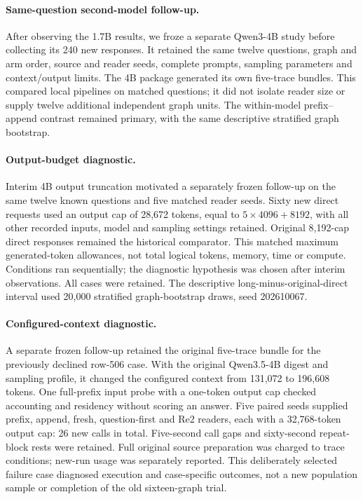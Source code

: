 \paragraph{Same-question second-model follow-up.} After observing the 1.7B results, we froze a separate Qwen3-4B study before collecting its 240 new responses. It retained the same twelve questions, graph and arm order, source and reader seeds, complete prompts, sampling parameters and context/output limits. The 4B package generated its own five-trace bundles. This compared local pipelines on matched questions; it did not isolate reader size or supply twelve additional independent graph units. The within-model prefix--append contrast remained primary, with the same descriptive stratified graph bootstrap.

\paragraph{Output-budget diagnostic.} Interim 4B output truncation motivated a separately frozen follow-up on the same twelve known questions and five matched reader seeds. Sixty new direct requests used an output cap of 28,672 tokens, equal to $5\times4096+8192$, with all other recorded inputs, model and sampling settings retained. Original 8,192-cap direct responses remained the historical comparator. This matched maximum generated-token allowances, not total logical tokens, memory, time or compute. Conditions ran sequentially; the diagnostic hypothesis was chosen after interim observations. All cases were retained. The descriptive long-minus-original-direct interval used 20,000 stratified graph-bootstrap draws, seed 202610067.

\paragraph{Configured-context diagnostic.} A separate frozen follow-up retained the original five-trace bundle for the previously declined row-506 case. With the original Qwen3.5-4B digest and sampling profile, it changed the configured context from 131,072 to 196,608 tokens. One full-prefix input probe with a one-token output cap checked accounting and residency without scoring an answer. Five paired seeds supplied prefix, append, fresh, question-first and Re2 readers, each with a 32,768-token output cap: 26 new calls in total. Five-second call gaps and sixty-second repeat-block rests were retained. Full original source preparation was charged to trace conditions; new-run usage was separately reported. This deliberately selected failure case diagnosed execution and case-specific outcomes, not a new population sample or completion of the old sixteen-graph trial.

